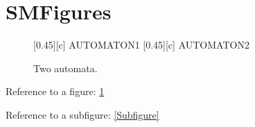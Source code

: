 \documentclass[class=scrartcl,crop=false]{standalone}
\begin{document}
\section{SMFigures}

\begin{figure}[t]
    {%
        \centering
        [0.45\textwidth][c]
        {%
            AUTOMATON1
        }
    }
    {%
        \centering
        [0.45\textwidth][c]
        {%
            AUTOMATON2
        }
    }
    \caption{Two automata.}
    \label{Figure}
\end{figure}

Reference to a figure: \ref{Figure}

Reference to a subfigure: \ref{Subfigure}
\end{document}

